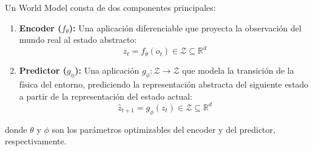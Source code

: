 \begin{definition}
Un World Model consta de dos componentes principales:
\begin{enumerate}
    \item \textbf{Encoder ($f_{\theta}$):} Una aplicación diferenciable que proyecta la observación del mundo real al estado abstracto:
    \begin{equation}
    z_t = f_{\theta}(o_t) \in \mathcal{Z} \subseteq \mathbb{R}^d
    \end{equation}
    \item \textbf{Predictor ($g_{\phi}$):} Una aplicación $g_{\phi} : \mathcal{Z} \to \mathcal{Z}$ que modela la transición de la física del entorno, prediciendo la representación abstracta del siguiente estado a partir de la representación del estado actual:
    \begin{equation}
    \hat{z}_{t+1} = g_{\phi}(z_t) \in \mathcal{Z} \subseteq \mathbb{R}^d
    \end{equation}
\end{enumerate}
donde $\theta$ y $\phi$ son los parámetros optimizables del encoder y del predictor, respectivamente.
\end{definition}
